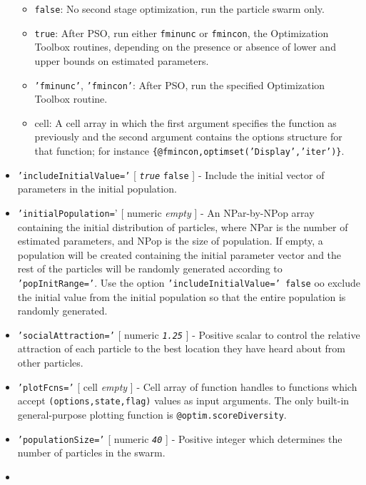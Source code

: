 \begin{itemize}
  \begin{itemize}
  \item
    \texttt{false}: No second stage optimization, run the particle swarm
    only.
  \item
    \texttt{true}: After PSO, run either \texttt{fminunc} or
    \texttt{fmincon}, the Optimization Toolbox routines, depending on
    the presence or absence of lower and upper bounds on estimated
    parameters.
  \item
    \texttt{'fminunc'}, \texttt{'fmincon'}: After PSO, run the specified
    Optimization Toolbox routine.
  \item
    cell: A cell array in which the first argument specifies the
    function as previously and the second argument contains the options
    structure for that function; for instance
    \texttt{\{@fmincon,optimset('Display','iter')\}}.
  \end{itemize}
\item
  \texttt{'includeInitialValue='} {[} \emph{\texttt{true}} \textbar{}
  \texttt{false} {]} - Include the initial vector of parameters in the
  initial population.
\item
  \texttt{'initialPopulation=}' {[} numeric \textbar{} \emph{empty} {]}
  - An NPar-by-NPop array containing the initial distribution of
  particles, where NPar is the number of estimated parameters, and NPop
  is the size of population. If empty, a population will be created
  containing the initial parameter vector and the rest of the particles
  will be randomly generated according to \texttt{'popInitRange='}. Use
  the option \texttt{'includeInitialValue=' false} oo exclude the
  initial value from the initial population so that the entire
  population is randomly generated.
\item
  \texttt{'socialAttraction='} {[} numeric \textbar{}
  \emph{\texttt{1.25}} {]} - Positive scalar to control the relative
  attraction of each particle to the best location they have heard about
  from other particles.
\item
  \texttt{'plotFcns='} {[} cell \textbar{} \emph{empty} {]} - Cell array
  of function handles to functions which accept
  \texttt{(options,state,flag)} values as input arguments. The only
  built-in general-purpose plotting function is
  \texttt{@optim.scoreDiversity}.
\item
  \texttt{'populationSize='} {[} numeric \textbar{} \emph{\texttt{40}}
  {]} - Positive integer which determines the number of particles in the
  swarm.
\item

\end{itemize}
